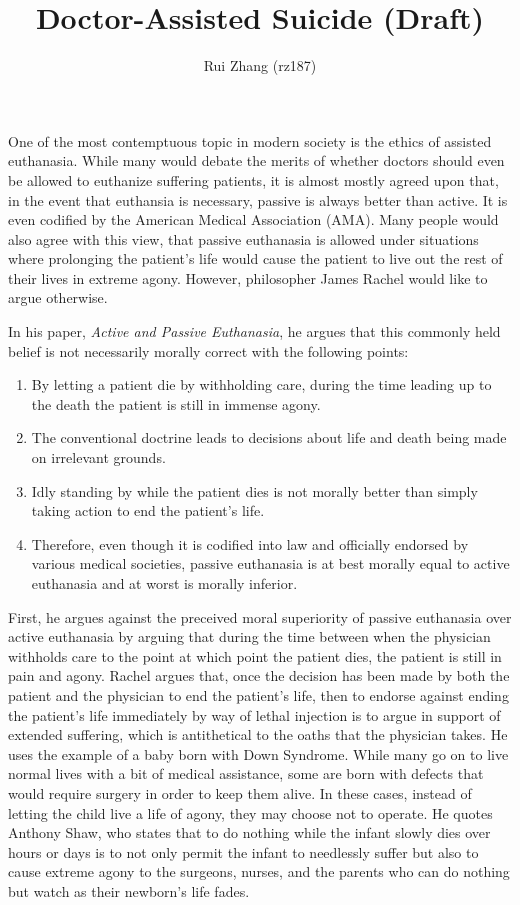 \documentclass{article}
\begin{document}
\title{Doctor-Assisted Suicide (Draft)}
\author{Rui Zhang (rz187)}
\maketitle
One of the most contemptuous topic in modern society is the ethics of
assisted euthanasia. While many would debate the merits of whether doctors
should even be allowed to euthanize suffering patients, it is almost mostly
agreed upon that, in the event that euthansia is necessary, passive is
always better than active. It is even codified by the American Medical
Association (AMA). Many people would also agree with this view, that passive
euthanasia is allowed under situations where prolonging the patient's life
would cause the patient to live out the rest of their lives in extreme
agony. However, philosopher James Rachel would like to argue otherwise.

In his paper, {\em Active and Passive Euthanasia}, he argues that this
commonly held belief is not necessarily morally correct with the following
points:
\begin{enumerate}
    \item By letting a patient die by withholding care, during the time leading up to the
    death the patient is still in immense agony.
    \item The conventional doctrine leads to decisions about life and death being made on irrelevant grounds.
    \item Idly standing by while the patient dies is not morally better than simply taking
    action to end the patient's life.
    \item Therefore, even though it is codified into law and officially endorsed by
    various medical societies, passive euthanasia is at best morally equal to active
    euthanasia and at worst is morally inferior.
\end{enumerate}

First, he argues against the preceived moral superiority of passive euthanasia over
active euthanasia by arguing that during the time between when the physician withholds
care to the point at which point the patient dies, the patient is still in pain and
agony. Rachel argues that, once the decision has been made by both the patient and
the physician to end the patient's life, then to endorse against ending the patient's
life immediately by way of lethal injection is to argue in support of extended suffering,
which is antithetical to the oaths that the physician takes. He uses the example
of a baby born with Down Syndrome. While many go on to live normal lives with a
bit of medical assistance, some are born with defects that would require surgery in
order to keep them alive. In these cases, instead of letting the child live a life
of agony, they may choose not to operate. He quotes Anthony Shaw, who states that
to do nothing while the infant slowly dies over hours or days is to not only permit
the infant to needlessly suffer but also to cause extreme agony to the surgeons,
nurses, and the parents who can do nothing but watch as their newborn's life fades.
\end{document}
